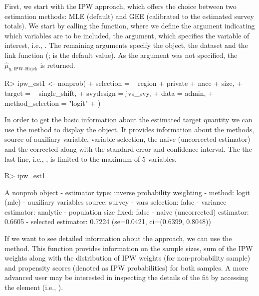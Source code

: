 \documentclass[nojss]{jss}
\begin{document}
First, we start with the IPW approach, which offers the choice between
two estimation methods: MLE (default) and GEE (calibrated to the
estimated survey totals). We start by calling the 
function, where we define the  argument indicating which
variables are to be included, the  argument, which
specifies the variable of interest, i.e., . The
remaining arguments specify the  object, the dataset and
the link function (;  is the
default value). As the  argument was not specified, the
\(\hat{\mu}_{y,\text{IPW-H\'{a}jek}}\) is returned.

\begin{CodeChunk}
\begin{CodeInput}
R> ipw_est1 <- nonprob(
+   selection = ~ region + private + nace + size,
+   target = ~ single_shift,
+   svydesign = jvs_svy,
+   data = admin,
+   method_selection = "logit"
+ )
\end{CodeInput}
\end{CodeChunk}

In order to get the basic information about the estimated target
quantity we can use the  method to display the object. It
provides information about the methods, source of auxiliary variable,
variable selection, the naive (uncorrected estimator) and the corrected
along with the standard error and confidence interval. The the last
line, i.e., , is limited to the maximum of 5
variables.

\begin{CodeChunk}
\begin{CodeInput}
R> ipw_est1
\end{CodeInput}
\begin{CodeOutput}
A nonprob object
 - estimator type: inverse probability weighting
 - method: logit (mle)
 - auxiliary variables source: survey
 - vars selection: false
 - variance estimator: analytic
 - population size fixed: false
 - naive (uncorrected) estimator: 0.6605
 - selected estimator: 0.7224 (se=0.0421, ci=(0.6399, 0.8048))
\end{CodeOutput}
\end{CodeChunk}

If we want to see detailed information about the approach, we can use
the  method. This function provides information on the
sample sizes, sum of the IPW weights along with the distribution of IPW
weights (for non-probability sample) and propensity scores (denoted as
IPW probabilities) for both samples. A more advanced user may be
interested in inspecting the details of the fit by accessing the
 element (i.e., ).
\end{document}
